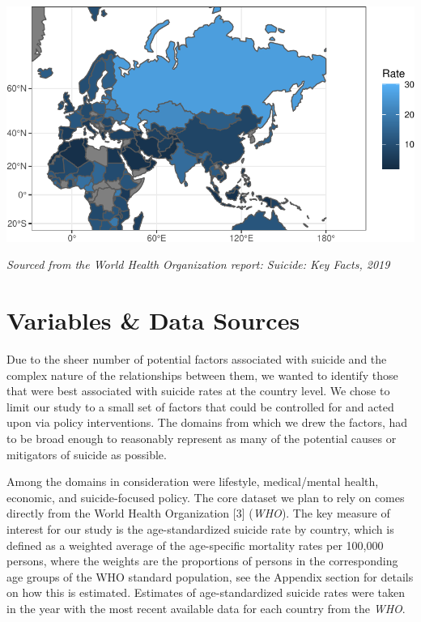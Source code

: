 \documentclass[]{article}
\begin{document}
\begin{center}\includegraphics{Project_Report_files/figure-latex/russia_map_plot-1} \end{center}

\emph{Sourced from the World Health Organization report: Suicide: Key
Facts, 2019}

\section{Variables \& Data Sources}\label{variables-data-sources}

Due to the sheer number of potential factors associated with suicide and
the complex nature of the relationships between them, we wanted to
identify those that were best associated with suicide rates at the
country level. We chose to limit our study to a small set of factors
that could be controlled for and acted upon via policy interventions.
The domains from which we drew the factors, had to be broad enough to
reasonably represent as many of the potential causes or mitigators of
suicide as possible.

Among the domains in consideration were lifestyle, medical/mental
health, economic, and suicide-focused policy. The core dataset we plan
to rely on comes directly from the World Health Organization {[}3{]}
(\emph{WHO}). The key measure of interest for our study is the
age-standardized suicide rate by country, which is defined as a weighted
average of the age-specific mortality rates per 100,000 persons, where
the weights are the proportions of persons in the corresponding age
groups of the WHO standard population, see the Appendix section for
details on how this is estimated. Estimates of age-standardized suicide
rates were taken in the year with the most recent available data for
each country from the \emph{WHO}.
\end{document}
